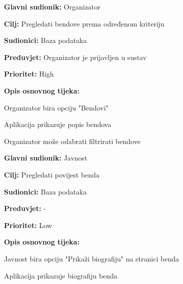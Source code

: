 \noindent {}
	\begin{packed_item}
		
		\item \textbf{Glavni sudionik:} Organizator
		\item \textbf{Cilj:} Pregledati bendove prema određenom kriteriju
		\item \textbf{Sudionici:} Baza podataka
		\item \textbf{Preduvjet:} Organizator je prijavljen u sustav
		\item \textbf{Prioritet:} High
		\item \textbf{Opis osnovnog tijeka:} 
		
		\item[] \begin{packed_enum}
			
			\item Organizator bira opciju "Bendovi"
			\item Aplikacija prikazuje popis bendova
			\item Organizator može odabrati filtrirati bendove
		\end{packed_enum}  
	
	\end{packed_item}


\noindent {}
	\begin{packed_item}
		
		\item \textbf{Glavni sudionik:} Javnost
		\item \textbf{Cilj:} Pregledati povijest benda
		\item \textbf{Sudionici:} Baza podataka
		\item \textbf{Preduvjet:} -
		\item \textbf{Prioritet:} Low
		\item \textbf{Opis osnovnog tijeka:} 
		
		\item[] \begin{packed_enum}
			
			\item Javnost bira opciju "Prikaži biografiju" na stranici benda
			\item Aplikacija prikazuje biografiju benda
		\end{packed_enum}  
	\end{packed_item}

